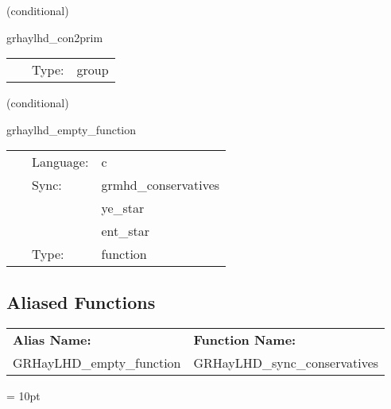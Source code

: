 \vspace{5mm}

   (conditional) 

\hspace{5mm} grhaylhd\_con2prim 

\hspace{5mm}{\it compute primitive variables from conservatives } 


\hspace{5mm}

 \begin{tabular*}{160mm}{cll} 
~ & Type:  & group \\ 
\end{tabular*} 


\vspace{5mm}

   (conditional) 

\hspace{5mm} grhaylhd\_empty\_function 

\hspace{5mm}{\it sync conservative variable ghost zones for c2p routine } 


\hspace{5mm}

 \begin{tabular*}{160mm}{cll} 
~ & Language:  & c \\ 
~ & Sync:  & grmhd\_conservatives \\ 
~& ~ &ye\_star\\ 
~& ~ &ent\_star\\ 
~ & Type:  & function \\ 
\end{tabular*} 


\subsection*{Aliased Functions}

\hspace{5mm}

 \begin{tabular*}{160mm}{ll} 

{\bf Alias Name:} ~~~~~~~ & {\bf Function Name:} \\ 
GRHayLHD\_empty\_function & GRHayLHD\_sync\_conservatives \\ 
\end{tabular*} 



\vspace{5mm}\parskip = 10pt 
